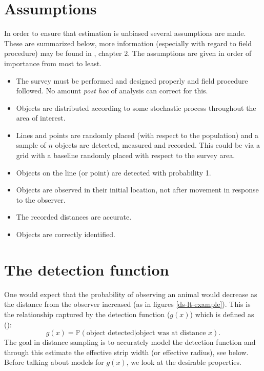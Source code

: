 \section{Assumptions}
In order to ensure that estimation is unbiased several assumptions are made. These are summarized below, more information (especially with regard to field procedure) may be found in , chapter 2. The assumptions are given in order of importance from most to least.
\begin{itemize}
	\item The survey must be performed and designed properly and field procedure followed. No amount \textit{post hoc} of analysis can correct for this.
	\item Objects are distributed according to some stochastic process throughout the area of interest.
	\item Lines and points are randomly placed (with respect to the population) and a sample of $n$ objects are detected, measured and recorded. This could be via a grid with a baseline randomly placed with respect to the survey area.
	\item Objects on the line (or point) are detected with probability 1.
	\item Objects are observed in their initial location, not after movement in response to the observer.
	\item The recorded distances are accurate.
	\item Objects are correctly identified.
\end{itemize}

\section{The detection function}
\label{intro-ds-detefct}

One would expect that the probability of observing an animal would decrease as the distance from the observer increased (as in figures \ref{ds-lt-example}). This is the relationship captured by the detection function ($g(x)$) which is defined as (\cite[p. 10]{IDS}):
\begin{equation*}
g(x)=\mathbb{P} (\text{object detected} | \text{object was at distance } x).
\end{equation*}
The goal in distance sampling is to accurately model the detection function and through this estimate the effective strip width (or effective radius), see  below. Before talking about models for $g(x)$, we look at the desirable properties.


